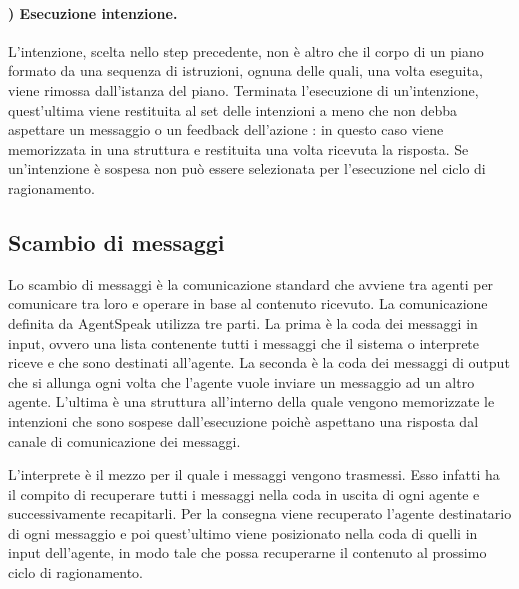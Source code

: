 \paragraph{) Esecuzione intenzione.}
L'intenzione, scelta nello step precedente, non è altro che il corpo di un piano formato da una sequenza di istruzioni, ognuna delle quali, una volta eseguita, viene rimossa dall'istanza del piano.
Terminata l'esecuzione di un'intenzione, quest'ultima viene restituita al set delle intenzioni a meno che non debba aspettare un messaggio o un feedback dell'azione \cite{JasonAgentSpeak}: in questo caso viene memorizzata in una struttura e restituita una volta ricevuta la risposta.
Se un'intenzione è sospesa non può essere selezionata per l'esecuzione nel ciclo di ragionamento.

\subsection*{Scambio di messaggi}
Lo scambio di messaggi è la comunicazione standard che avviene tra agenti per comunicare tra loro e operare in base al contenuto ricevuto.
La comunicazione definita da AgentSpeak utilizza tre parti. La prima è la coda dei messaggi in input, ovvero una lista contenente tutti i messaggi che il sistema o interprete riceve e che sono destinati all'agente. La seconda è la coda dei messaggi di output che si allunga ogni volta che l'agente vuole inviare un messaggio ad un altro agente. L'ultima è una struttura all'interno della quale vengono memorizzate le intenzioni che sono sospese dall'esecuzione poichè aspettano una risposta dal canale di comunicazione dei messaggi.

L'interprete è il mezzo per il quale i messaggi vengono trasmessi. Esso infatti ha il compito di recuperare tutti i messaggi nella coda in uscita di ogni agente e successivamente recapitarli. Per la consegna viene recuperato l'agente destinatario di ogni messaggio e poi quest'ultimo viene posizionato nella coda di quelli in input dell'agente, in modo tale che possa recuperarne il contenuto al prossimo ciclo di ragionamento.

